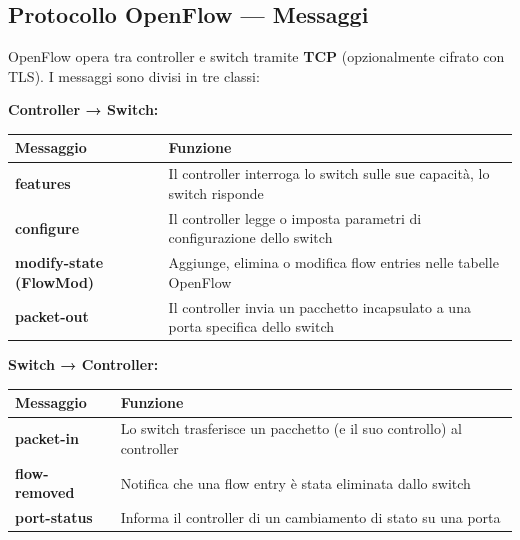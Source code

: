 \documentclass[
  italian,
  openany]{book}
\newcounter{none} %
\begin{document}
\subsection{Protocollo OpenFlow ---
Messaggi}\label{protocollo-openflow-messaggi}

OpenFlow opera tra controller e switch tramite \textbf{TCP}
(opzionalmente cifrato con TLS). I messaggi sono divisi in tre classi:

\textbf{Controller → Switch:}

{\def\LTcaptype{none} %
\begin{longtable}[]{@{}
  >{\raggedright\arraybackslash}p{}
  >{\raggedright\arraybackslash}p{}@{}}
\toprule\noalign{}
\begin{minipage}[b]{\linewidth}\raggedright
Messaggio
\end{minipage} & \begin{minipage}[b]{\linewidth}\raggedright
Funzione
\end{minipage} \\
\midrule\noalign{}
\endhead
\bottomrule\noalign{}
\endlastfoot
\textbf{features} & Il controller interroga lo switch sulle sue
capacità, lo switch risponde \\
\textbf{configure} & Il controller legge o imposta parametri di
configurazione dello switch \\
\textbf{modify-state (FlowMod)} & Aggiunge, elimina o modifica flow
entries nelle tabelle OpenFlow \\
\textbf{packet-out} & Il controller invia un pacchetto incapsulato a una
porta specifica dello switch \\
\end{longtable}
}

\textbf{Switch → Controller:}

{\def\LTcaptype{none} %
\begin{longtable}[]{@{}
  >{\raggedright\arraybackslash}p{}
  >{\raggedright\arraybackslash}p{}@{}}
\toprule\noalign{}
\begin{minipage}[b]{\linewidth}\raggedright
Messaggio
\end{minipage} & \begin{minipage}[b]{\linewidth}\raggedright
Funzione
\end{minipage} \\
\midrule\noalign{}
\endhead
\bottomrule\noalign{}
\endlastfoot
\textbf{packet-in} & Lo switch trasferisce un pacchetto (e il suo
controllo) al controller \\
\textbf{flow-removed} & Notifica che una flow entry è stata eliminata
dallo switch \\
\textbf{port-status} & Informa il controller di un cambiamento di stato
su una porta \\
\end{longtable}
}
\end{document}
